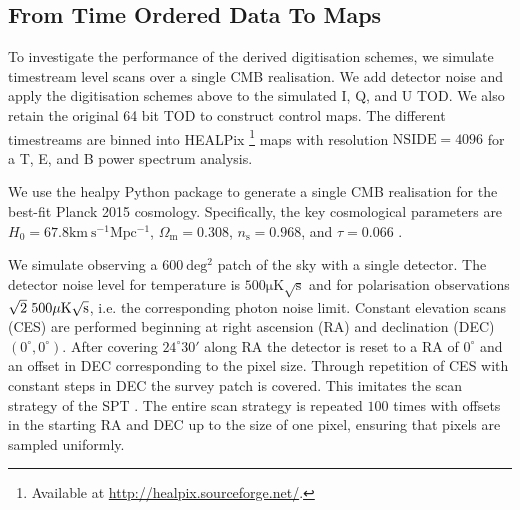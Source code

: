 \documentclass[a4paper,fleqn,usenatbib]{mnras}
\begin{document}
\subsection{From Time Ordered Data To Maps}
\label{subsec:method}

To investigate the performance of the derived digitisation schemes, we simulate timestream level scans over a single CMB realisation. We add detector noise and apply the digitisation schemes above to the simulated I, Q, and U TOD. We also retain the original 64 bit TOD to construct control maps. The different timestreams are binned into HEALPix \citep{healpix}\footnote{Available at \url{http://healpix.sourceforge.net/}.} maps with resolution $\mathrm{NSIDE} = 4096$ for a T, E, and B power spectrum analysis.


We use the healpy Python package to generate a single CMB realisation for the best-fit Planck 2015 cosmology. Specifically, the key cosmological parameters are $H_0 = 67.8 \mathrm{km \> s^{-1} Mpc^{-1}}$, $\Omega_{\mathrm{m}} = 0.308 $, $n_{\mathrm{s}} = 0.968$, and $\tau = 0.066$ \citep{planck2016}.


We simulate observing a $600 \> \mathrm{ deg^2}$ patch of the sky with a single detector. The detector noise level for temperature is $500 \mathrm{\mu K \sqrt{s}}$ and for polarisation observations $\sqrt{2} \hspace{0.7ex} 500 \mathrm{\mu K \sqrt{s}}$, i.e. the corresponding photon noise limit. Constant elevation scans (CES) are performed beginning at right ascension (RA) and declination (DEC) $(0^\circ, 0^\circ)$. After covering $24^\circ30'$ along RA the detector is reset to a RA of $0^\circ$ and an offset in DEC corresponding to the pixel size. Through repetition of CES with constant steps in DEC the survey patch is covered. This imitates the scan strategy of the SPT \citep{schaffer2011}. The entire scan strategy is repeated $100$ times with offsets in the starting RA and DEC up to the size of one pixel, ensuring that pixels are sampled uniformly.
\end{document}
